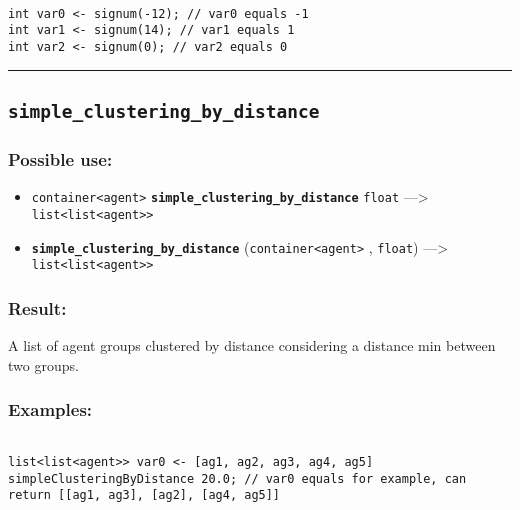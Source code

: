 \documentclass[]{book}
\providecommand{\tightlist}{%
  \setlength{\itemsep}{0pt}\setlength{\parskip}{0pt}}
\theoremstyle{definition}
\theoremstyle{definition}
\theoremstyle{definition}
\theoremstyle{remark}
\begin{document}
\begin{verbatim}
 
int var0 <- signum(-12); // var0 equals -1 
int var1 <- signum(14); // var1 equals 1 
int var2 <- signum(0); // var2 equals 0
\end{verbatim}

\begin{center}\rule{0.5\linewidth}{\linethickness}\end{center}

\subsection{\texorpdfstring{\texttt{simple\_clustering\_by\_distance}}{simple\_clustering\_by\_distance}}\label{simple_clustering_by_distance}

\subsubsection{Possible use:}\label{possible-use-473}

\begin{itemize}
\tightlist
\item
  \texttt{container\textless{}agent\textgreater{}}
  \textbf{\texttt{simple\_clustering\_by\_distance}} \texttt{float}
  ---\textgreater{}
  \texttt{list\textless{}list\textless{}agent\textgreater{}\textgreater{}}
\item
  \textbf{\texttt{simple\_clustering\_by\_distance}}
  (\texttt{container\textless{}agent\textgreater{}} , \texttt{float})
  ---\textgreater{}
  \texttt{list\textless{}list\textless{}agent\textgreater{}\textgreater{}}
\end{itemize}

\subsubsection{Result:}\label{result-457}

A list of agent groups clustered by distance considering a distance min
between two groups.

\subsubsection{Examples:}\label{examples-329}

\begin{verbatim}
 
list<list<agent>> var0 <- [ag1, ag2, ag3, ag4, ag5] simpleClusteringByDistance 20.0; // var0 equals for example, can return [[ag1, ag3], [ag2], [ag4, ag5]]
\end{verbatim}
\end{document}
